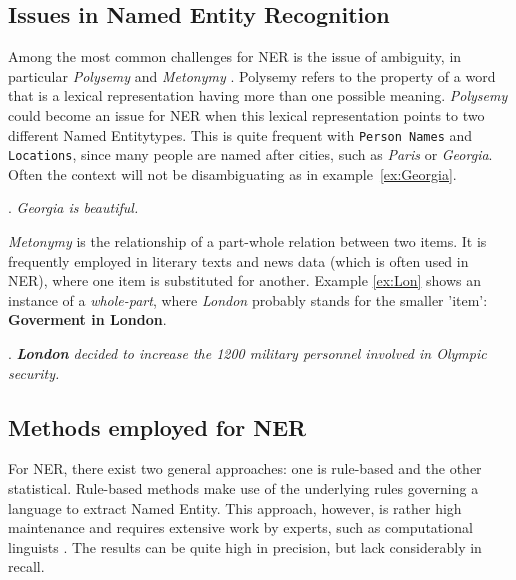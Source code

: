 \documentclass[11pt]{article}
\newcommand{\namedentity}{Named Entity}
\begin{document}
\subsection{Issues in Named Entity Recognition}
Among the most common challenges for NER is the issue of ambiguity, in particular \emph{Polysemy} and \emph{Metonymy} \cite{nadeau2007survey}.
Polysemy refers to the property of a word that is a lexical representation having more than one possible meaning.
\emph{Polysemy} could become an issue for NER when this lexical representation points to two different \namedentity types.
This is quite frequent with \texttt{Person Names} and \texttt{Locations}, since many people are named after cities, such as \emph{Paris} or \emph{Georgia}. 
Often the context will not be disambiguating as in example~\ref{ex:Georgia}.

\ex. \emph{Georgia is beautiful.} \label{ex:Georgia}

\emph{Metonymy} is the relationship of a part-whole relation between two items.
It is frequently employed in literary texts and news data (which is often used in NER), where one item is substituted for another. 
Example \ref{ex:Lon} shows an instance of a \emph{whole-part}, where \emph{London} probably stands for the smaller 'item': \textbf{Goverment in London}. 

\ex. \emph{\textbf{London} decided to increase the 1200 military personnel involved in Olympic security.} \label{ex:Lon}

\subsection{Methods employed for NER}
For NER, there exist two general approaches: one is rule-based and the other statistical. 
Rule-based methods make use of the underlying rules governing a language to extract \namedentity. 
This approach, however, is rather high maintenance and requires extensive work by experts, such as computational linguists \cite{nadeau2007survey}.
The results can be quite high in precision, but lack considerably in recall. %
\end{document}
